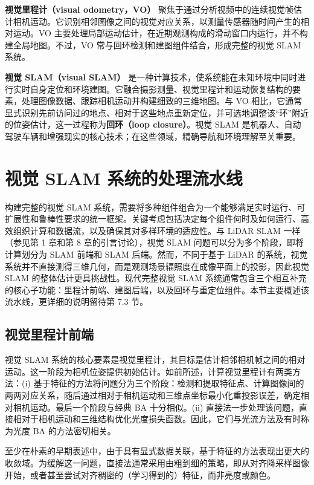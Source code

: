 \textbf{视觉里程计（visual odometry，VO）} 聚焦于通过分析视频中的连续视觉帧估计相机运动。它识别相邻图像之间的视觉对应关系，以测量传感器随时间产生的相对运动。VO 主要处理局部运动估计，在近期观测构成的滑动窗口内运行，并不构建全局地图。不过，VO 常与回环检测和建图组件结合，形成完整的视觉 SLAM 系统。

\textbf{视觉 SLAM（visual SLAM）} 是一种计算技术，使系统能在未知环境中同时进行实时自身定位和环境建图。它融合摄影测量、视觉里程计和运动恢复结构的要素，处理图像数据、跟踪相机运动并构建细致的三维地图。与 VO 相比，它通常显式识别先前访问过的地点、相对于这些地点重新定位，并可选地调整该“环”附近的位姿估计，这一过程称为\textbf{回环（loop closure）}。视觉 SLAM 是机器人、自动驾驶车辆和增强现实的核心技术；在这些领域，精确导航和环境理解至关重要。

\section{视觉 SLAM 系统的处理流水线}

构建完整的视觉 SLAM 系统，需要将多种组件组合为一个能够满足实时运行、可扩展性和鲁棒性要求的统一框架。关键考虑包括决定每个组件何时及如何运行、高效组织计算和数据流，以及确保其对多样环境的适应性。与 LiDAR SLAM 一样（参见第 1 章和第 8 章的引言讨论），视觉 SLAM 问题可以分为多个阶段，即将计算划分为 SLAM 前端和 SLAM 后端。然而，不同于基于 LiDAR 的系统，视觉系统并不直接测得三维几何，而是观测场景辐照度在成像平面上的投影，因此视觉 SLAM 的整体估计更具挑战性。现代完整视觉 SLAM 系统通常包含三个相互补充的核心子功能：里程计前端、建图后端，以及回环与重定位组件。本节主要概述该流水线，更详细的说明留待第 7.3 节。

\subsection{视觉里程计前端}

视觉 SLAM 系统的核心要素是视觉里程计，其目标是估计相邻相机帧之间的相对运动。这一阶段为相机位姿提供初始估计。如前所述，计算视觉里程计有两类方法：(i) 基于特征的方法将问题分为三个阶段：检测和提取特征点、计算图像间的两两对应关系，随后通过相对于相机运动和三维点坐标最小化重投影误差，确定相对相机运动。最后一个阶段与经典 BA 十分相似。(ii) 直接法一步处理该问题，直接相对于相机运动和三维结构优化光度损失函数。因此，它们与光流方法及有时称为光度 BA 的方法密切相关。

至少在朴素的早期表述中，由于具有显式数据关联，基于特征的方法表现出更大的收敛域。为缓解这一问题，直接法通常采用由粗到细的策略，即从对齐降采样图像开始，或者甚至尝试对齐稠密的（学习得到的）特征，而非亮度或颜色。

